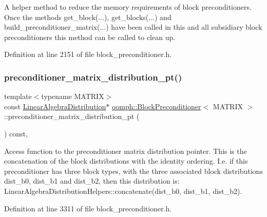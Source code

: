 A helper method to reduce the memory requirements of block preconditioners. Once the methods get\+\_\+block(...), get\+\_\+blocks(...) and build\+\_\+preconditioner\+\_\+matrix(...) have been called in this and all subsidiary block preconditioners this method can be called to clean up. 



Definition at line 2151 of file block\+\_\+preconditioner.\+h.

\mbox{\label{classoomph_1_1BlockPreconditioner_a74eeff188f842dd8abdff1b7d9801d44}} 
\subsubsection{\texorpdfstring{preconditioner\+\_\+matrix\+\_\+distribution\+\_\+pt()}{preconditioner\_matrix\_distribution\_pt()}}
{\footnotesize\ttfamily template$<$typename M\+A\+T\+R\+IX$>$ \\
const \hyperlink{classoomph_1_1LinearAlgebraDistribution}{Linear\+Algebra\+Distribution}$\ast$ \hyperlink{classoomph_1_1BlockPreconditioner}{oomph\+::\+Block\+Preconditioner}$<$ M\+A\+T\+R\+IX $>$\+::preconditioner\+\_\+matrix\+\_\+distribution\+\_\+pt (\begin{DoxyParamCaption}{ }\end{DoxyParamCaption}) const\hspace{0.3cm}{\ttfamily [inline]}, {\ttfamily [protected]}}



Access function to the preconditioner matrix distribution pointer. This is the concatenation of the block distributions with the identity ordering. I.\+e. if this preconditioner has three block types, with the three associated block distributions dist\+\_\+b0, dist\+\_\+b1 and dist\+\_\+b2, then this distribution is\+: Linear\+Algebra\+Distribution\+Helpers\+::concatenate(dist\+\_\+b0, dist\+\_\+b1, dist\+\_\+b2). 



Definition at line 3311 of file block\+\_\+preconditioner.\+h.

\mbox{\label{classoomph_1_1BlockPreconditioner_ac8ef0e69b712d9ab7902d277a14ed8f5}} 
